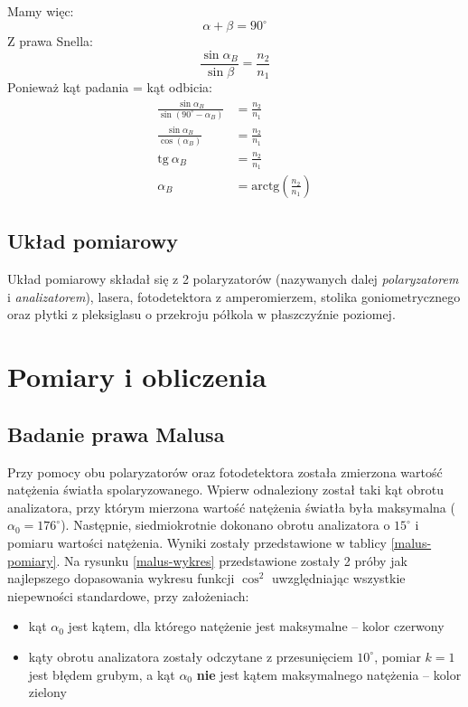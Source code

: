 \documentclass[a4paper]{article}
\begin{document}
Mamy więc:
\[ \alpha + \beta = 90^\circ \]
Z prawa Snella:
\[ 	\frac{\sin \alpha_{B}}{\sin \beta} = \frac{n_2}{n_1} \]
Ponieważ kąt padania = kąt odbicia: 
\begin{align*}
 	\frac{\sin \alpha_{B}}{\sin (90^\circ - \alpha_B)} &= \frac{n_2}{n_1} \\
	\frac{\sin \alpha_{B}}{\cos (\alpha_B)} &= \frac{n_2}{n_1} \\
	\text{tg} \ \alpha_{B} &= \frac{n_2}{n_1} \\
	\alpha_B &= \text{arctg} \left(\frac{n_2}{n_1}\right)
\end{align*}
\subsection{Układ pomiarowy}
Układ pomiarowy składał się z 2 polaryzatorów (nazywanych dalej \textit{polaryzatorem} i \textit{analizatorem}), lasera, fotodetektora z amperomierzem, stolika goniometrycznego oraz płytki z pleksiglasu o przekroju półkola w płaszczyźnie poziomej.


\section{Pomiary i obliczenia}
\subsection{Badanie prawa Malusa}
Przy pomocy obu polaryzatorów oraz fotodetektora została zmierzona wartość natężenia światła spolaryzowanego.
Wpierw odnaleziony został taki kąt obrotu analizatora, przy którym mierzona wartość natężenia światła była maksymalna ($\alpha_0 = 176^\circ$).
Następnie, siedmiokrotnie dokonano obrotu analizatora o $15^\circ$ i pomiaru wartości natężenia.
Wyniki zostały przedstawione w tablicy \ref{malus-pomiary}. 
Na rysunku \ref{malus-wykres} przedstawione zostały 2 próby jak najlepszego dopasowania wykresu funkcji $\cos^2$ uwzględniając wszystkie niepewności standardowe, przy założeniach:
\begin{itemize}
	\item kąt $\alpha_0$ jest kątem, dla którego natężenie jest maksymalne -- kolor czerwony
	\item kąty obrotu analizatora zostały odczytane z przesunięciem $10^\circ$, pomiar $k=1$ jest błędem grubym, a kąt $\alpha_0$ \textbf{nie} jest kątem maksymalnego natężenia -- kolor zielony
\end{itemize}
\end{document}
